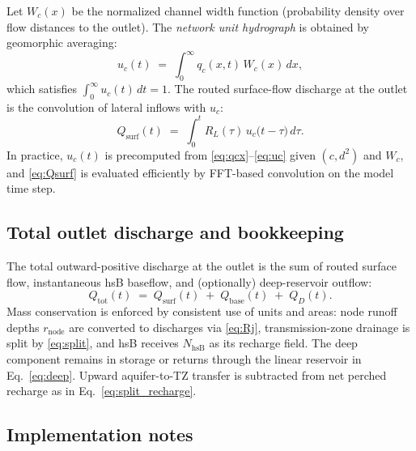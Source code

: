 \documentclass[12pt]{article}
\begin{document}
Let $W_c(x)$ be the normalized channel width function (probability density over flow distances to the outlet). The \emph{network unit hydrograph} is obtained by geomorphic averaging:
\begin{equation}
u_c(t) \;=\; \int_{0}^{\infty} q_c(x,t)\, W_c(x)\, dx,
\label{eq:uc}
\end{equation}
which satisfies $\int_0^\infty u_c(t)\,dt = 1$. The routed surface-flow discharge at the outlet is the convolution of lateral inflows with $u_c$:
\begin{equation}
Q_{\text{surf}}(t) \;=\; \int_{0}^{t} R_L(\tau)\, u_c\!\bigl(t-\tau\bigr)\, d\tau.
\label{eq:Qsurf}
\end{equation}
In practice, $u_c(t)$ is precomputed from \eqref{eq:qcx}--\eqref{eq:uc} given $(c,d^2)$ and $W_c$, and \eqref{eq:Qsurf} is evaluated efficiently by FFT-based convolution on the model time step.


\subsection{Total outlet discharge and bookkeeping}

The total outward-positive discharge at the outlet is the sum of routed surface flow, instantaneous hsB baseflow, and (optionally) deep-reservoir outflow:
\begin{equation}
Q_{\text{tot}}(t) \;=\; Q_{\text{surf}}(t) \;+\; Q_{\text{base}}(t) \;+\; Q_D(t).
\label{eq:Qtot}
\end{equation}
Mass conservation is enforced by consistent use of units and areas: node runoff depths $r_{\text{node}}$ are converted to discharges via \eqref{eq:Rj}, transmission-zone drainage is split by \eqref{eq:split}, and hsB receives $N_{\text{hsB}}$ as its recharge field. The deep component remains in storage or returns through the linear reservoir in Eq.~\eqref{eq:deep}. Upward aquifer-to-TZ transfer is subtracted from net perched recharge as in Eq.~\eqref{eq:split_recharge}.

\subsection{Implementation notes}
\end{document}
